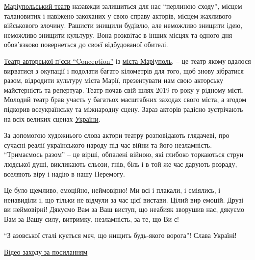 \href{\urlMariupolDramTeatrIA}{Маріупольський театр} назавжди залишиться для нас \enquote{перлиною сходу}, місцем
талановитих і навіжено закоханих у свою справу акторів, місцем жахливого
військового злочину. Рашисти знищили будівлю, але неможливо знищити ідею,
неможливо знищити культуру. Вона розквітає в інших місцях та одного дня
обов'язково повернеться до своєї відбудованої обителі.  

\href{\urlTeatrConceptionMariupolIA}{Театр авторської п'єси
\enquote{Conception}} із \href{\urlMariupolIA}{міста Маріуполь}, – це театр
якому вдалося вирватися з окупації і подолати багато кілометрів для того, щоб
знову зібратися разом, відродити культуру міста Марії, презентувати нам свою
акторську майстерність та репертуар. Театр почав свій шлях 2019-го року у
рідному місті. Молодий театр брав участь у багатьох масштабних заходах свого
міста, а згодом підкорив всеукраїнську та міжнародну сцену. Зараз акторів
радісно зустрічають на всіх великих сценах \href{\urlUkrainaIA}{України}.

За допомогою художнього слова актори театру розповідають глядачеві, про
сучасні реалії українського народу під час війни та його незламність.
\enquote{Тримаємось разом} – це вірші, обпалені війною, які глибоко торкаються струн
людської душі, викликають сльози, гнів, біль і в той же час дарують розраду,
вселяють віру і надію в нашу Перемогу.

Це було щемливо, емоційно, неймовірно! Ми всі і плакали, і сміялись, і
ненавиділи і, що тільки не відчули за час цієї вистави. Цілий  вир емоцій.
Друзі ви неймовірні! Дякуємо Вам за Ваш виступ, що неабияк зворушив нас,
дякуємо Вам за Вашу силу, витримку, незламність, за те, що Ви є!

\enquote{З азовської сталі кується меч, що нищить будь-якого ворога}! Слава Україні!

\href{https://archive.org/details/video.28_03_2023.muzej_literatury_ukrainy.blagodijna_akcia_ja_teatr_i_vijna}{%
Відео заходу за посиланням%
}
